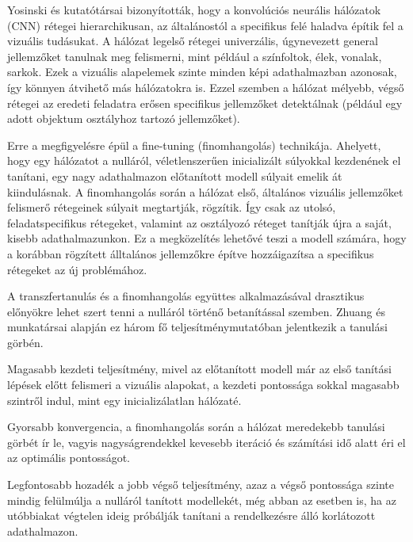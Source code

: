 Yosinski és kutatótársai \cite{yosinskiHowTransferableAre2014} bizonyították, hogy a konvolúciós
neurális hálózatok (CNN) rétegei hierarchikusan, az általánostól a
specifikus felé haladva építik fel a vizuális tudásukat. A hálózat
legelső rétegei univerzális, úgynevezett general jellemzőket tanulnak
meg felismerni, mint például a színfoltok, élek, vonalak, sarkok. Ezek a
vizuális alapelemek szinte minden képi adathalmazban azonosak, így
könnyen átvihető más hálózatokra is. Ezzel szemben a hálózat mélyebb,
végső rétegei az eredeti feladatra erősen specifikus jellemzőket
detektálnak (például egy adott objektum osztályhoz tartozó jellemzőket).

Erre a megfigyelésre épül a fine-tuning (finomhangolás) technikája.
Ahelyett, hogy egy hálózatot a nulláról, véletlenszerűen inicializált
súlyokkal kezdenének el tanítani, egy nagy adathalmazon előtanított
modell súlyait emelik át kiindulásnak. A finomhangolás során a hálózat
első, általános vizuális jellemzőket felismerő rétegeinek súlyait
megtartják, rögzítik. Így csak az utolsó, feladatspecifikus rétegeket,
valamint az osztályozó réteget tanítják újra a saját, kisebb
adathalmazunkon. Ez a megközelítés lehetővé teszi a modell számára, hogy
a korábban rögzített álltalános jellemzőkre építve hozzáigazítsa a
specifikus rétegeket az új problémához. \cite{yosinskiHowTransferableAre2014}

A transzfertanulás és a finomhangolás együttes alkalmazásával drasztikus
előnyökre lehet szert tenni a nulláról történő betanítással szemben.
Zhuang és munkatársai \cite{zhuangComprehensiveSurveyTransfer2021} alapján ez három fő teljesítménymutatóban
jelentkezik a tanulási görbén.

Magasabb kezdeti teljesítmény, mivel az előtanított modell már az első
tanítási lépések előtt felismeri a vizuális alapokat, a kezdeti
pontossága sokkal magasabb szintről indul, mint egy inicializálatlan
hálózaté.

Gyorsabb konvergencia, a finomhangolás során a hálózat meredekebb
tanulási görbét ír le, vagyis nagyságrendekkel kevesebb iteráció és
számítási idő alatt éri el az optimális pontosságot.

Legfontosabb hozadék a jobb végső teljesítmény, azaz a végső pontossága
szinte mindig felülmúlja a nulláról tanított modellekét, még abban az
esetben is, ha az utóbbiakat végtelen ideig próbálják tanítani a
rendelkezésre álló korlátozott adathalmazon.


